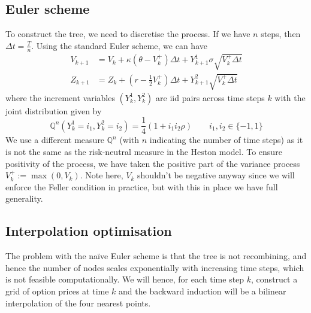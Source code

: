 \subsection{Euler scheme}
To construct the tree, we need to discretise the process. If we have $n$ steps, then $\Delta t = \frac Tn$. Using the standard Euler scheme, we can have
\begin{align}
    V_{k+1} &= V_k + \kappa (\theta - V_k^+)\Delta t + Y^1_{k+1} \sigma \sqrt{V_k^+ \Delta t} \\
    Z_{k+1} &= Z_k + (r - \tfrac 12 V_k^+)\Delta t + Y^2_{k+1} \sqrt{V_k^+ \Delta t}
\end{align}
where the increment variables $(Y_k^1, Y_k^2)$ are iid pairs across time steps $k$ with the joint distribution given by
\begin{equation}
    \mathbb Q^n(Y_k^1 = i_1, Y_k^2 = i_2) = \frac 14 (1 + i_1i_2\rho) \qquad i_1, i_2 \in \{-1, 1\}
\end{equation}
We use a different measure $\mathbb Q^n$ (with $n$ indicating the number of time steps) as it is not the same as the risk-neutral measure in the Heston model. To ensure positivity of the process, we have taken the positive part of the variance process $V_k^+ :=\max(0, V_k)$. Note here, $V_k$ shouldn't be negative anyway since we will enforce the Feller condition in practice, but with this in place we have full generality.

\subsection{Interpolation optimisation}

The problem with the naïve Euler scheme is that the tree is not recombining, and hence the number of nodes scales exponentially with increasing time steps, which is not feasible computationally. We will hence, for each time step $k$, construct a grid of option prices at time $k$ and the backward induction will be a bilinear interpolation of the four nearest points.

